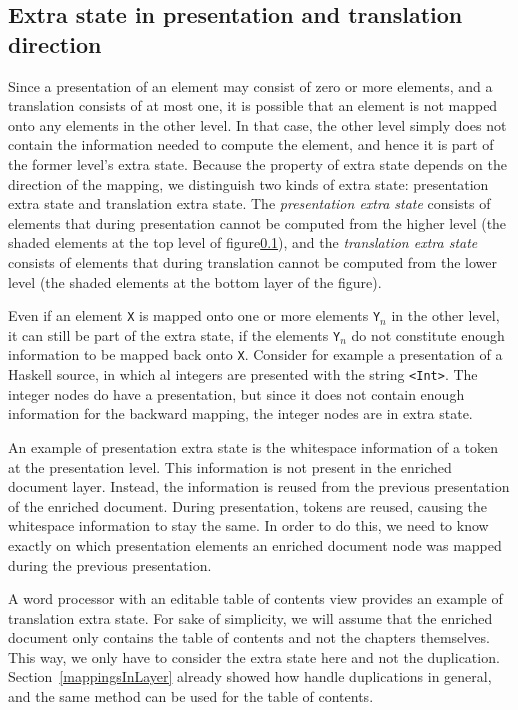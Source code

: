 %										
%										
\subsection{Extra state in presentation and translation direction}

Since a presentation of an element may consist of zero or more elements, and a translation consists of at most one, it is possible that an element is not mapped onto any elements in the other level. In that case, the other level simply does not contain the information needed to compute the element, and hence it is part of the former level's extra state. Because the property of extra state depends on the direction of the mapping, we distinguish two kinds of extra state: presentation extra state and translation extra state. The {\em presentation extra state} consists of elements that during presentation cannot be computed from the higher level (the shaded elements at the top level of figure\ref{}), and the {\em translation extra state} consists of elements that during translation cannot be computed from the lower level (the shaded elements at the bottom layer of the figure).

Even if an element \verb|X| is mapped onto one or more elements \verb|Y|$_n$  in the other level, it can still be part of the extra state, if the elements \verb|Y|$_n$ do not constitute enough information to be mapped back onto \verb|X|. Consider for example a presentation of a Haskell source, in which al integers are presented with the string \verb|<Int>|. The integer nodes do have a presentation, but since it does not contain enough information for the backward mapping, the integer nodes are in extra state.  

An example of presentation extra state is the whitespace information of a token at the presentation level. This information is not present in the enriched document layer. Instead, the information is reused from the previous presentation of the enriched document. During presentation, tokens are reused, causing the whitespace information to stay the same. In order to do this, we need to know exactly on which presentation elements an enriched document node was mapped during the previous presentation.

A word processor with an editable table of contents view provides an example of translation extra state.  For sake of simplicity, we will assume that the enriched document only contains the table of contents and not the chapters themselves. This way, we only have to consider the extra state here and not the duplication. Section~\ref{mappingsInLayer} already showed how handle duplications in general, and the same method can be used for the table of contents. 

